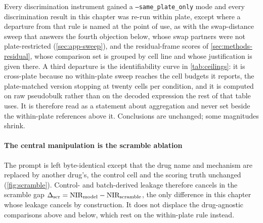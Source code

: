\begin{scopelimit}
Every discrimination instrument gained a \texttt{--same\_plate\_only} mode and
every discrimination result in this chapter was re-run within plate, except
where a departure from that rule is named at the point of use, as with the
swap-distance sweep that answers the fourth objection below, whose swap partners
were not plate-restricted (\cref{sec:app-sweep}), and the residual-frame scores
of \cref{sec:methods-residual}, whose comparison set is grouped by cell line and
whose justification is given there. A third departure is the identifiability
curve in \cref{tab:ceilings}: it is cross-plate because no within-plate sweep
reaches the cell budgets it reports, the plate-matched version stopping at
twenty cells per condition, and it is computed on raw pseudobulk rather than on
the decoded expression the rest of that table uses. It is therefore read as a
statement about aggregation and never set beside the within-plate references
above it. Conclusions are unchanged; some magnitudes shrink.
\end{scopelimit}

\paragraph{The central manipulation is the scramble ablation} The prompt is left
byte-identical except that the drug name and mechanism are replaced by another
drug's, the control cell and the scoring truth unchanged
(\cref{fig:scramble}). Control- and batch-derived leakage therefore cancels in
the scramble gap $\Delta_{\textrm{scr}} = \textrm{NIR}_{\textrm{model}} - \textrm{NIR}_{\textrm{scramble}}$, the
only difference in this chapter whose leakage cancels by construction. It does
not displace the drug-agnostic comparisons above and below, which rest on the
within-plate rule instead.

